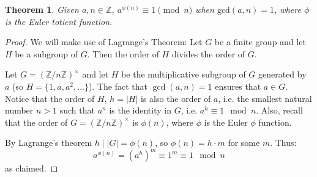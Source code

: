 \documentclass[12pt]{article}
\newtheorem*{thm2}{Theorem}
\newcommand{\Ints}{\mathbb{Z}}
\begin{document}
\begin{thm2}
 Given $a, n \in \mathbb{Z}$, $a^{\phi (n)} \equiv 1 \pmod{n}$ when $\mbox{gcd}(a,n) = 1$, where $\phi$ is the Euler totient function.
\end{thm2}
\begin{proof}
We will make use of Lagrange's Theorem: Let $G$ be a finite group and let $H$ be a subgroup of $G$. Then the order of $H$ divides the order of $G$.

Let $G=(\Ints/n\Ints)^\times$ and let $H$ be the multiplicative subgroup of $G$ generated by $a$ (so $H=\{ 1, a ,a^2,\ldots \}$). The fact that $\gcd(a,n)=1$ ensures that $a\in G$. Notice that the order of $H$, $h=|H|$ is also the order of $a$, i.e. the smallest natural number $n>1$ such that $a^n$ is the identity in $G$, i.e. $a^h\equiv 1 \mod n$. Also, recall that the order of $G=(\Ints/n\Ints)^\times$ is $\phi(n)$, where $\phi$ is the Euler $\phi$ function.

By Lagrange's theorem $h \mid |G|=\phi(n)$, so $\phi(n)=h\cdot m$ for some $m$. Thus:
$$a^{\phi(n)}=(a^h)^m\equiv 1^m \equiv 1 \mod n$$
as claimed.
\end{proof}
\end{document}
